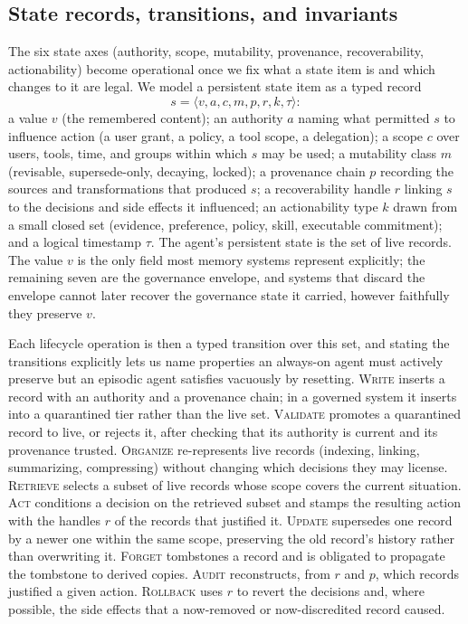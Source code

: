 \subsection{State records, transitions, and invariants}\label{subsec:records}

The six state axes (authority, scope, mutability, provenance, recoverability, actionability) become operational once we fix what a state item is and which changes to it are legal. We model a persistent state item as a typed record
\[
s = \langle v, a, c, m, p, r, k, \tau \rangle:
\]
a value $v$ (the remembered content); an authority $a$ naming what permitted $s$ to influence action (a user grant, a policy, a tool scope, a delegation); a scope $c$ over users, tools, time, and groups within which $s$ may be used; a mutability class $m$ (revisable, supersede-only, decaying, locked); a provenance chain $p$ recording the sources and transformations that produced $s$; a recoverability handle $r$ linking $s$ to the decisions and side effects it influenced; an actionability type $k$ drawn from a small closed set (evidence, preference, policy, skill, executable commitment); and a logical timestamp $\tau$. The agent's persistent state is the set of live records. The value $v$ is the only field most memory systems represent explicitly; the remaining seven are the governance envelope, and systems that discard the envelope cannot later recover the governance state it carried, however faithfully they preserve $v$.

Each lifecycle operation is then a typed transition over this set, and stating the transitions explicitly lets us name properties an always-on agent must actively preserve but an episodic agent satisfies vacuously by resetting. \textsc{Write} inserts a record with an authority and a provenance chain; in a governed system it inserts into a quarantined tier rather than the live set. \textsc{Validate} promotes a quarantined record to live, or rejects it, after checking that its authority is current and its provenance trusted. \textsc{Organize} re-represents live records (indexing, linking, summarizing, compressing) without changing which decisions they may license. \textsc{Retrieve} selects a subset of live records whose scope covers the current situation. \textsc{Act} conditions a decision on the retrieved subset and stamps the resulting action with the handles $r$ of the records that justified it. \textsc{Update} supersedes one record by a newer one within the same scope, preserving the old record's history rather than overwriting it. \textsc{Forget} tombstones a record and is obligated to propagate the tombstone to derived copies. \textsc{Audit} reconstructs, from $r$ and $p$, which records justified a given action. \textsc{Rollback} uses $r$ to revert the decisions and, where possible, the side effects that a now-removed or now-discredited record caused.

